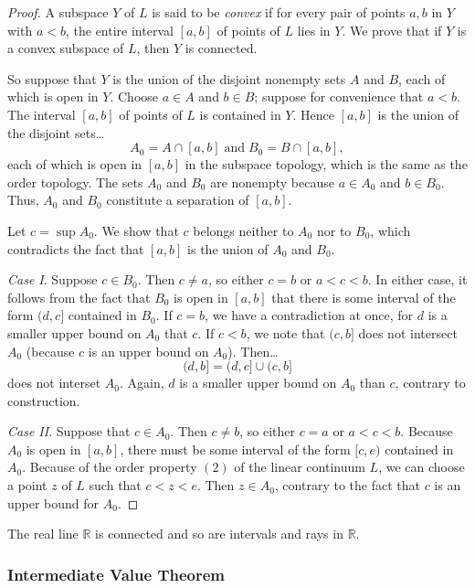 \begin{proof}
A subspace $Y$ of $L$ is said to be \emph{convex} if for every pair of points $a,b$ in $Y$ with $a<b$, the
entire interval $[a,b]$ of points of $L$ lies in $Y$. We prove that if $Y$ is a convex subspace of $L$, then
$Y$ is connected.

So suppose that $Y$ is the union of the disjoint nonempty sets $A$ and $B$, each of which is open in $Y$. Choose
$a \in A$ and $b \in B$; suppose for convenience that $a < b$. The interval $[a,b]$ of points of $L$ is contained in $Y$.
Hence $[a,b]$ is the union of the disjoint sets\dots
$$A_0 = A \cap [a,b] \; \textrm{and} \; B_0 = B \cap [a,b],$$
each of which is open in $[a,b]$ in the subspace topology, which is the same as the order topology. The sets $A_0$ and $B_0$
are nonempty because $a \in A_0$ and $b \in B_0$. Thus, $A_0$ and $B_0$ constitute a separation of $[a,b]$.

Let $c = \sup A_0$. We show that $c$ belongs neither to $A_0$ nor to $B_0$, which contradicts the fact that $[a,b]$
is the union of $A_0$ and $B_0$.

\emph{Case I}. Suppose $c \in B_0$. Then $c \neq a$, so either $c = b$ or $a < c < b$. In either case, it follows from the fact
that $B_0$ is open in $[a,b]$ that there is some interval of the form $(d,c]$ contained in $B_0$. If $c=b$, we have a contradiction
at once, for $d$ is a smaller upper bound on $A_0$ that $c$. If $c < b$, we note that $(c,b]$ does not intersect $A_0$ (because $c$ is
an upper bound on $A_0$). Then\dots
$$(d,b] = (d,c] \cup (c,b]$$
does not interset $A_0$. Again, $d$ is a smaller upper bound on $A_0$ than $c$, contrary to construction.

\emph{Case II}. Suppose that $c \in A_0$. Then $c \neq b$, so either $c = a$ or $a < c < b$. Because $A_0$ is open in $[a,b]$,
there must be some interval of the form $[c,e)$ contained in $A_0$. Because of the order property $(2)$ of the linear continuum $L$, we
can choose a point $z$ of $L$ such that $c < z < e$. Then $z \in A_0$, contrary to the fact that $c$ is an upper bound for $A_0$.
\end{proof}

\begin{corollary}
The real line $\mathbb{R}$ is connected and so are intervals and rays in $\mathbb{R}$.
\end{corollary}

\subsubsection{Intermediate Value Theorem}\label{ivt}

